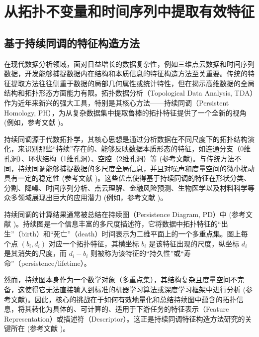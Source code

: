 \section{从拓扑不变量和时间序列中提取有效特征} %
\label{chap:feature_extraction}


    \subsection{基于持续同调的特征构造方法}
        \label{sec:tda_features}
        在现代数据分析领域，面对日益增长的数据复杂性，例如三维点云数据和时间序列数据，开发能够捕捉数据内在结构和本质信息的特征构造方法至关重要。传统的特征提取方法往往侧重于数据的局部几何属性或统计特性，但在揭示高维数据的全局结构和拓扑形态方面能力有限。拓扑数据分析（Topological Data Analysis, TDA）作为近年来新兴的强大工具，特别是其核心方法——持续同调（Persistent Homology, PH），为从复杂数据集中提取鲁棒的拓扑特征提供了一个全新的视角 (例如，参考文献 )。

持续同调源于代数拓扑学，其核心思想是通过分析数据在不同尺度下的拓扑结构演化，来识别那些“持续”存在的、能够反映数据本质形态的特征，如连通分支（0维孔洞）、环状结构（1维孔洞）、空腔（2维孔洞）等 (参考文献)。与传统方法不同，持续同调能够捕捉数据的多尺度全局信息，并且对噪声和度量空间的微小扰动具有一定的稳定性 (参考文献 )。这些优点使得基于持续同调的特征在形状分类、分割、降噪、时间序列分析、点云理解、金融风险预测、生物医学以及材料科学等众多领域展现出巨大的应用潜力 (例如，参考文献 )。

持续同调的计算结果通常被总结在持续图（Persistence Diagram, PD）中 (参考文献 )。持续图是一个信息丰富的多尺度描述符，它将数据中拓扑特征的“出生”（birth）和“死亡”（death）时间表示为二维平面上的一个多重点集。图上每个点 $(b_i, d_i)$ 对应一个拓扑特征，其横坐标 $b_i$ 是该特征出现的尺度，纵坐标 $d_i$ 是其消失的尺度，而 $d_i - b_i$ 则被称为该特征的“持久性”或“寿命”（persistence/lifetime）。

然而，持续图本身作为一个数学对象（多重点集），其结构复杂且度量空间不完备，这使得它无法直接输入到标准的机器学习算法或深度学习框架中进行分析 (参考文献)。因此，核心的挑战在于如何有效地量化和总结持续图中蕴含的拓扑信息，将其转化为具体的、可计算的、适用于下游任务的特征表示（Feature Representation）或描述符（Descriptor）。这正是持续同调特征构造方法研究的关键所在 (参考文献 )。

